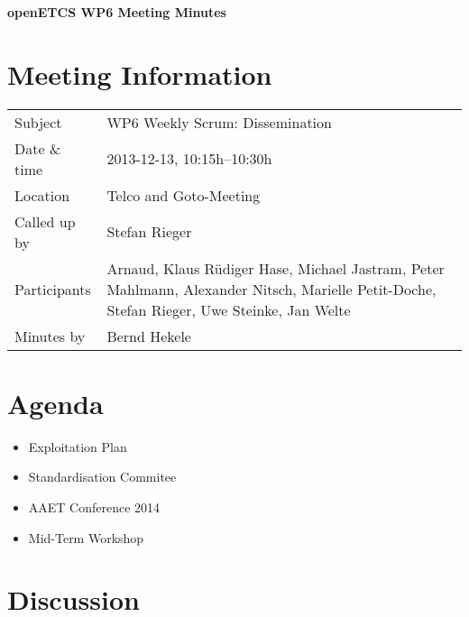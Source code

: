 \documentclass[a4paper, 11pt]{article}
\begin{document}
{\begin{center}\huge\bf openETCS WP6 Meeting Minutes\end{center}}
\section{Meeting Information}

\renewcommand{\arraystretch}{1.5}
\begin{supertabular}{m{.2\textwidth}m{.8\textwidth}}
Subject & WP6 Weekly Scrum: Dissemination\\
Date \& time & 2013-12-13, 10:15h--10:30h\\
Location & Telco and Goto-Meeting\\
Called up by & Stefan Rieger\\
Participants &
Arnaud,
Klaus R\"udiger Hase,
Michael Jastram,
Peter Mahlmann,
Alexander Nitsch,
Marielle Petit-Doche,
Stefan Rieger,
Uwe Steinke,
Jan Welte
\\

Minutes by & Bernd Hekele\\

\end{supertabular}
\renewcommand{\arraystretch}{1.0}


\section{Agenda}
\begin{itemize}

\item Exploitation Plan
\item Standardisation Commitee
\item AAET Conference 2014
\item Mid-Term Workshop

\end{itemize}

\section{Discussion}
\end{document}
